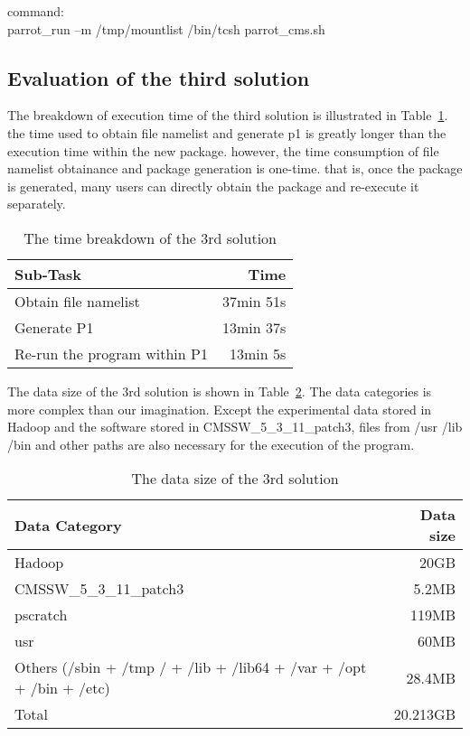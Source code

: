 \documentclass{article}
\begin{document}
command:\\
\indent parrot\_run –m /tmp/mountlist /bin/tcsh parrot\_cms.sh

\subsection{Evaluation of the third solution}
\indent The breakdown of execution time of the third solution is illustrated in Table~\ref{table:time-3rd}. the time used to obtain file namelist and generate p1 is greatly longer than the execution time within the new package. however, the time consumption of file namelist obtainance and package generation is one-time. that is, once the package is generated, many users can directly obtain the package and re-execute it separately. \\

\begin{table}
    \centering
    \begin{tabular}{|l|r|}
    \hline
    Sub-Task & Time \\ \hline
    Obtain file namelist & 37min 51s \\ \hline
    Generate P1 & 13min 37s \\ \hline
    Re-run the program within P1 & 13min 5s \\ \hline
    \end{tabular}
    \caption{The time breakdown of the 3rd solution}
    \label{table:time-3rd}
\end{table}
The data size of the 3rd solution is shown in Table~\ref{table:datasize-3rd}. The data categories is more complex than our imagination. Except the experimental data stored in Hadoop and the software stored in CMSSW\_5\_3\_11\_patch3, files from /usr /lib /bin and other paths are also necessary for the execution of the program.

\begin{table}
    \centering
    \begin{tabular}{|l|r|}
    \hline
    Data Category & Data size \\ \hline
    Hadoop & 20GB \\ \hline
    CMSSW\_5\_3\_11\_patch3 & 5.2MB \\ \hline
    pscratch & 119MB \\ \hline
    usr & 60MB \\ \hline
    Others (/sbin + /tmp / + /lib + /lib64 + /var + /opt + /bin + /etc) & 28.4MB \\ \hline
    Total & 20.213GB \\ \hline
    \end{tabular}
    \caption{The data size of the 3rd solution}
    \label{table:datasize-3rd}
\end{table}    
\end{document}
